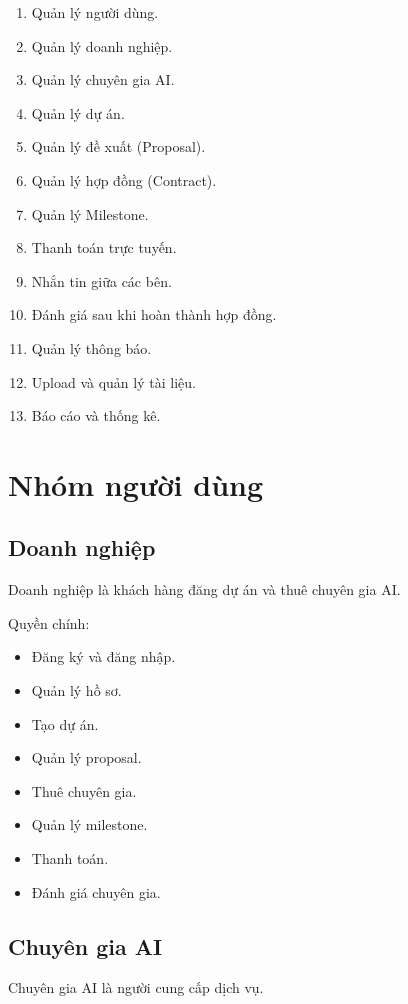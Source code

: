 \begin{enumerate}
\item Quản lý người dùng.
\item Quản lý doanh nghiệp.
\item Quản lý chuyên gia AI.
\item Quản lý dự án.
\item Quản lý đề xuất (Proposal).
\item Quản lý hợp đồng (Contract).
\item Quản lý Milestone.
\item Thanh toán trực tuyến.
\item Nhắn tin giữa các bên.
\item Đánh giá sau khi hoàn thành hợp đồng.
\item Quản lý thông báo.
\item Upload và quản lý tài liệu.
\item Báo cáo và thống kê.
\end{enumerate}

\section{Nhóm người dùng}

\subsection{Doanh nghiệp}

Doanh nghiệp là khách hàng đăng dự án và thuê chuyên gia AI.

Quyền chính:

\begin{itemize}
\item Đăng ký và đăng nhập.
\item Quản lý hồ sơ.
\item Tạo dự án.
\item Quản lý proposal.
\item Thuê chuyên gia.
\item Quản lý milestone.
\item Thanh toán.
\item Đánh giá chuyên gia.
\end{itemize}

\subsection{Chuyên gia AI}

Chuyên gia AI là người cung cấp dịch vụ.

